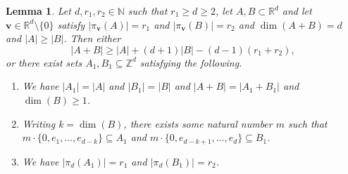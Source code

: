 \documentclass[10pt]{article}
\renewcommand\vec{\bm}
\newtheorem{lemma}[theorem]{Lemma}
\numberwithin{equation}{section}
\begin{document}
\begin{lemma} \label{realin}
Let $d, r_1, r_2 \in \mathbb{N}$ such that $r_1 \geq d\geq 2$, let $A, B \subset \mathbb{R}^d$ and let $\vec{v} \in \mathbb{R}^d \setminus \{0\}$ satisfy $|\pi_{\vec{v}}(A)| = r_1$ and $| \pi_{\vec{v}}(B)| = r_2$ and $\dim(A+B) = d$ and $|A| \geq |B|$. Then either 
\begin{equation} \label{ur3}
 |A+B| \geq |A| + (d+1)|B| - (d-1)(r_1 + r_2)  ,
 \end{equation}
or there exist sets $A_1,B_1 \subseteq \mathbb{Z}^d$ satisfying the following. 
\begin{enumerate}
\item We have $|A_1| = |A|$ and $|B_1| = |B|$ and $|A+B| = |A_1+B_1|$ and $\dim(B) \geq 1$.
\item Writing $k = \dim(B)$, there exists some natural number $m$ such that $m \cdot \{0, e_1, \dots, e_{d-k} \} \subseteq A_1$ and  $m \cdot \{0, e_{d-k+1}, \dots, e_d\} \subseteq B_1$.
\item We have $|\pi_{d}(A_1)| = r_1$ and $|\pi_{d}(B_1)| = r_2$.
\end{enumerate}
\end{lemma}
\end{document}
